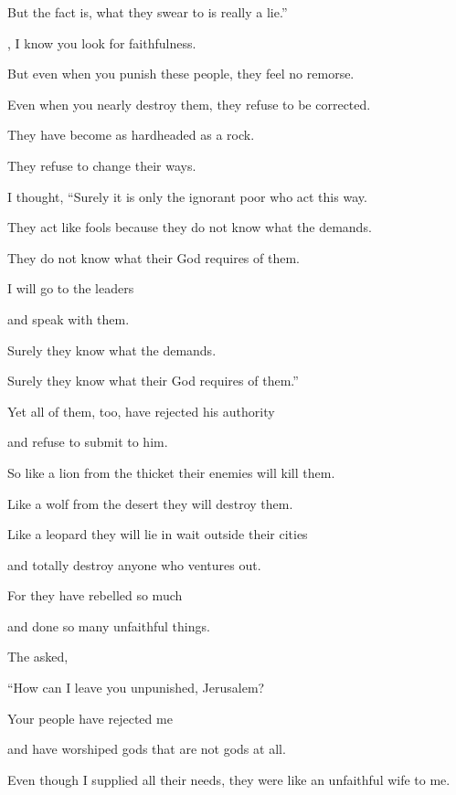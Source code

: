 {\par }{\Q But the fact is, what
they swear
to is really a lie.”
\par }{\Q {}, I know you look
for faithfulness.
\par }{\Q But even when
you punish these people, they feel no
remorse.
\par }{\Q Even
when you nearly
destroy
them, they refuse
to be corrected.
\par }{\Q They have become as hardheaded
as a rock.
\par }{\Q They refuse
to change their ways.
\par }{\Q {}I
thought,
“Surely
it is only the ignorant poor
who act this way.
\par }{\Q They
act like fools
because
they do not
know
what the
{}
demands.
\par }{\Q They do
not know what their God
requires of them.
\par }{\Q {}I will go
to
the leaders
\par }{\Q and speak
with them.
\par }{\Q Surely
they
know what the
{}
demands.
\par }{\Q Surely
they
know
what their God
requires
of them.”
\par }{\Q Yet all
of them,
too,
have rejected his authority
\par }{\Q and refuse to submit to him.
\par }{\Q {}So
like a lion
from the thicket
their enemies will kill
them.
\par }{\Q Like a wolf
from the desert
they will destroy
them.
\par }{\Q Like a leopard
they will lie in wait
outside their cities
\par }{\Q and totally
destroy
anyone
who ventures out.
\par }{\Q For
they have rebelled
so much
\par }{\Q and done so many
unfaithful things.
\par }{\PP {}The
{} asked,
\par }{\Q “How can
I leave you unpunished, Jerusalem?

\par }{\Q Your people have rejected
me
\par }{\Q and have
worshiped
gods
that are
not
gods
at all.

\par }{\Q Even though
I supplied all
their
needs,
they
were like an unfaithful
wife to me.

}
